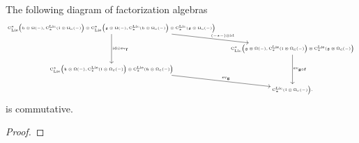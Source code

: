 \documentclass[11pt]{amsart}
\numberwithin{equation}{section}
\begin{document}
 
 
\begin{lmm}\label{L:NatPptyofComp}
 The following diagram of factorization algebras 
 \[\tiny \begin{tikzcd}
 \clies\big(\fh \otimes \Omega(-), \cliels(\fl \otimes \Omega_c(-)  \big) 
 \otimes  \clies\big(\fg \otimes \Omega(-), \cliels(\fh \otimes \Omega_c(-)  \big) 
 \otimes \cliels(\fg \otimes \Omega_c(-)  \big) \arrow[rd, "(-\star-)\otimes \id"]
 \arrow[dd, "\id\otimes \ev_ {\mathbf{f}}"]& \\ 
 & \clies\big(\fg \otimes \Omega(-), \cliels(\fl \otimes \Omega_c(-)  \big) 
 \otimes \cliels(\fg \otimes \Omega_c(-)  \big)
 \arrow[dd, "\ev_{\mathbf{g}\circ \mathbf{f}}"]\\
\clies\big(\fh \otimes \Omega(-), \cliels(\fl \otimes \Omega_c(-)  \big) 
 \otimes \cliels(\fh \otimes \Omega_c(-)  \big)  \arrow[rd, "\ev_{\mathbf{g}}"] & \\  & \cliels(\fl \otimes \Omega_c(-)  \big). 
\end{tikzcd}\]
 is commutative.
\end{lmm}
\begin{proof}
 
\end{proof}
\end{document}
